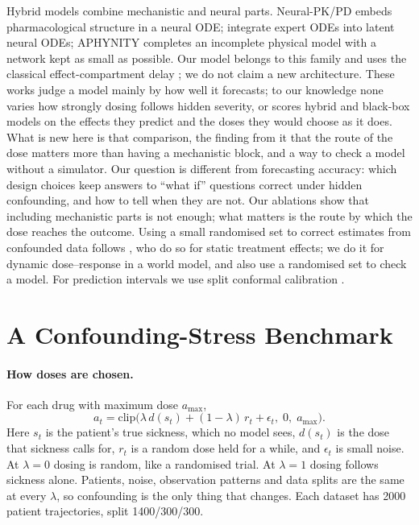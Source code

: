 \documentclass[letterpaper]{article}
\begin{document}
Hybrid models combine mechanistic and neural parts. Neural-PK/PD \citep{lu2021neuralpkpd} embeds pharmacological structure in a neural ODE; \citet{qian2021integrating} integrate expert ODEs into latent neural ODEs; APHYNITY \citep{yin2021aphynity} completes an incomplete physical model with a network kept as small as possible. Our model belongs to this family and uses the classical effect-compartment delay \citep{sheiner1979ke0}; we do not claim a new architecture. These works judge a model mainly by how well it forecasts; to our knowledge none varies how strongly dosing follows hidden severity, or scores hybrid and black-box models on the effects they predict and the doses they would choose as it does. What is new here is that comparison, the finding from it that the route of the dose matters more than having a mechanistic block, and a way to check a model without a simulator. Our question is different from forecasting accuracy: which design choices keep answers to ``what if'' questions correct under hidden confounding, and how to tell when they are not. Our ablations show that including mechanistic parts is not enough; what matters is the route by which the dose reaches the outcome. Using a small randomised set to correct estimates from confounded data follows \citet{kallus2018grounding}, who do so for static treatment effects; we do it for dynamic dose--response in a world model, and also use a randomised set to check a model. For prediction intervals we use split conformal calibration \citep{lei2018conformal}.

\section{A Confounding-Stress Benchmark}

\paragraph{How doses are chosen.} For each drug with maximum dose $a_{\max}$,
\begin{equation}
a_t = \mathrm{clip}\big(\lambda\, d(s_t) + (1-\lambda)\, r_t + \epsilon_t,\; 0,\; a_{\max}\big).
\end{equation}
Here $s_t$ is the patient's true sickness, which no model sees, $d(s_t)$ is the dose that sickness calls for, $r_t$ is a random dose held for a while, and $\epsilon_t$ is small noise. At $\lambda=0$ dosing is random, like a randomised trial. At $\lambda=1$ dosing follows sickness alone. Patients, noise, observation patterns and data splits are the same at every $\lambda$, so confounding is the only thing that changes. Each dataset has 2000 patient trajectories, split 1400/300/300.
\end{document}
